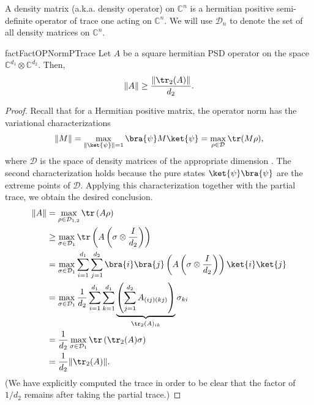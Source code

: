 \begin{definition}
    A density matrix (a.k.a. density operator) on $\mathbb{C}^n$ is a hermitian positive semi-definite operator of trace one acting on $\mathbb{C}^n$. We will use $\mathcal{D}_n$ to denote the set of all density matrices on $\mathbb{C}^n$.
\end{definition}

\begin{restatable}{fact}{FactOPNormPTrace} \label{fact:op-norm-ptrace}
    Let $A$ be a square hermitian PSD operator on the space $\mathbb{C}^{d_1} \otimes \mathbb{C}^{d_2}$. Then,
    \[\|A\| \geq \frac{\|\tr_2(A)\|}{d_2}.\]
\end{restatable}
\begin{proof}
    Recall that for a Hermitian positive matrix, the operator norm has the variational characterizations
    \begin{equation}
        \| M \| = \max_{\| \ket{\psi} \| = 1} \bra{\psi} M \ket{\psi} = \max_{\rho \in \mathcal{D}} \tr(M \rho),
    \end{equation}
    where $\mathcal{D}$ is the space of density matrices of the appropriate dimension . The second characterization holds because the pure states $\ket{\psi}\bra{\psi}$ are the extreme points of $\mathcal{D}$. Applying this characterization together with the partial trace, we obtain the desired conclusion.
    \begin{align*}
        \|A\|  &= \max_{\rho \in \mathcal{D}_{1,2}} \tr\left(A \rho\right) \\
        &\geq \max_{\sigma \in \mathcal{D}_{1}} \tr\left(A \left(\sigma \otimes \frac{I}{d_2}\right)\right)\\
        &= \max_{\sigma \in \mathcal{D}_1} \sum_{i=1}^{d_1} \sum_{j=1}^{d_2} \bra{i}\bra{j} \left(A \left(\sigma \otimes \frac{I}{d_2} \right)\right) \ket{i} \ket{j} \\
        &= \max_{\sigma \in \mathcal{D}_1} \frac{1}{d_2} \sum_{i=1}^{d_1}  \sum_{k=1}^{d_1} \underbrace{\left(\sum_{j=1}^{d_2} A_{(ij) (kj)}\right)}_{\tr_2(A)_{ik}}  \sigma_{ki} \\
        &= \frac{1}{d_2} \max_{\sigma \in \mathcal{D}_{1}} \tr\left(\tr_2(A) \sigma \right)\\
        &= \frac{1}{d_2} \|\tr_2(A)\|.
    \end{align*}
    (We have explicitly computed the trace in order to be clear that the factor of $1/d_2$ remains after taking the partial trace.)
\end{proof}





